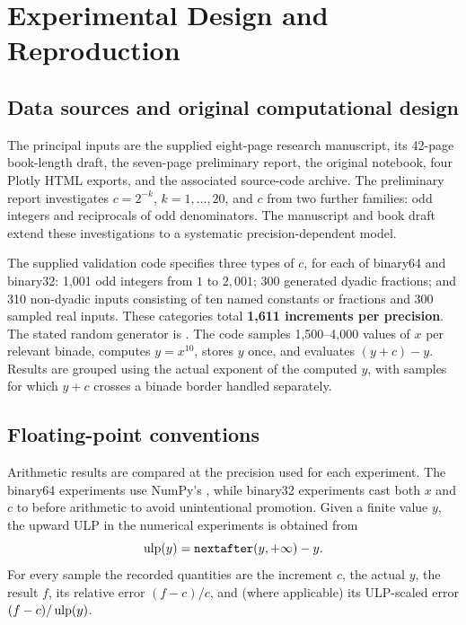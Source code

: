 \chapter{Experimental Design and Reproduction}\label{ch:method}

\section{Data sources and original computational design}
The principal inputs are the supplied eight-page research manuscript, its 42-page book-length draft, the seven-page preliminary report, the original  notebook, four Plotly HTML exports, and the associated source-code archive. The preliminary report investigates $c=2^{-k}$, $k=1,\ldots,20$, and $c$ from two further families: odd integers and reciprocals of odd denominators. The manuscript and book draft extend these investigations to a systematic precision-dependent model.

The supplied validation code specifies three types of $c$, for each of binary64 and binary32: 1,001 odd integers from $1$ to $2,001$; 300 generated dyadic fractions; and 310 non-dyadic inputs consisting of ten named constants or fractions and 300 sampled real inputs. These categories total \textbf{1,611 increments per precision}. The stated random generator is . The code samples 1,500--4,000 values of $x$ per relevant binade, computes $y=x^{10}$, stores $y$ once, and evaluates $(y+c)-y$. Results are grouped using the actual exponent of the computed $y$, with samples for which $y+c$ crosses a binade border handled separately.

\section{Floating-point conventions}
Arithmetic results are compared at the precision used for each experiment. The binary64 experiments use NumPy's , while binary32 experiments cast both $x$ and $c$ to  before arithmetic to avoid unintentional promotion. Given a finite value $y$, the upward ULP in the numerical experiments is obtained from
\begin{equation}\label{eq:nextafter}
 \ulp(y)=\code{nextafter}(y,+\infty)-y.
\end{equation}
For every sample the recorded quantities are the increment $c$, the actual $y$, the result $f$, its relative error $(f-c)/c$, and (where applicable) its ULP-scaled error $(f-c)/\operatorname{ulp}(y)$.

